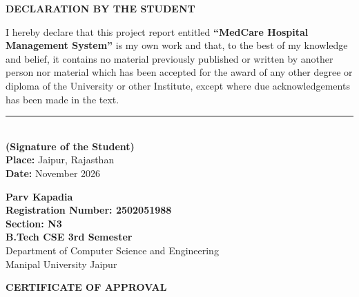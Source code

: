 \documentclass[12pt,a4paper]{article}
\begin{document}
\newpage

\thispagestyle{plain}
\begin{center}
    {\Large \textbf{DECLARATION BY THE STUDENT}}\\[0.8cm]
\end{center}

\noindent I hereby declare that this project report entitled \textbf{``MedCare Hospital Management System''} is my own work and that, to the best of my knowledge and belief, it contains no material previously published or written by another person nor material which has been accepted for the award of any other degree or diploma of the University or other Institute, except where due acknowledgements has been made in the text.

\vspace{3.5cm}

\noindent
\begin{minipage}[t]{0.45\textwidth}
    \vspace{0pt}
    \rule{5.5cm}{0.5pt}\\
    \textbf{(Signature of the Student)}\\[0.3cm]
    \textbf{Place:} Jaipur, Rajasthan\\
    \textbf{Date:} November 2026
\end{minipage}
\hfill
\begin{minipage}[t]{0.48\textwidth}
    \vspace{0pt}
    \raggedleft
    \textbf{Parv Kapadia}\\
    \textbf{Registration Number: 2502051988}\\
    \textbf{Section: N3}\\
    \textbf{B.Tech CSE 3rd Semester}\\
    Department of Computer Science and Engineering\\
    Manipal University Jaipur
\end{minipage}

\vspace{2.0cm}

\begin{center}
    {\Large \textbf{CERTIFICATE OF APPROVAL}}\\[0.6cm]
\end{center}
\end{document}
